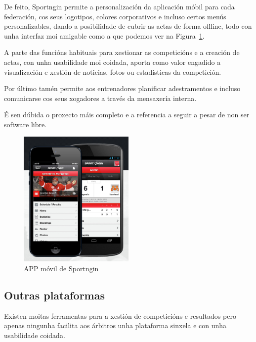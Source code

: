     De feito, Sportngin permite a personalización da aplicación móbil para 
cada federación, cos seus logotipos, colores corporativos e incluso certos 
menús personalizables, dando a posibilidade de cubrir as actas de forma 
offline, todo con unha interfaz moi amigable como a que podemos ver na 
Figura~\ref{fig:img:sportngin}.

    A parte das funcións habituais para xestionar as competicións e a creación 
de actas, con unha usabilidade moi coidada, aporta como valor engadido a 
visualización e xestión de noticias, fotos ou estadísticas da competición.

    Por último tamén permite aos entrenadores planificar adestramentos e incluso 
comunicarse cos seus xogadores a través da mensaxería interna.

    É sen dúbida o proxecto máis completo e a referencia a seguir a pesar de 
non ser software libre.
 
    \begin{figure}[h!]
      \begin{center}
	\includegraphics[width=0.5\textwidth]{./img/sportngin-app.png}
	\caption{APP móvil de Sportngin}
	\label{fig:img:sportngin}
      \end{center}
    \end{figure}


    \subsection{Outras plataformas}
    Existen moitas ferramentas para a xestión de competicións e resultados pero apenas 
ningunha facilita aos árbitros unha plataforma sinxela e con unha 
usabilidade coidada.

